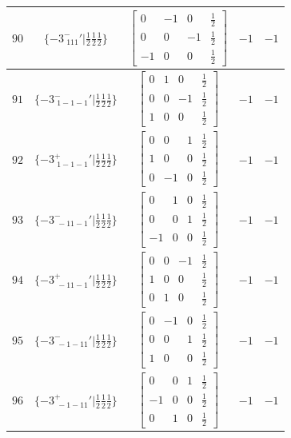 \documentclass[fleqn,8pt]{jsarticle}
\begin{document}
\begin{longtable}{ccccc}
$ 90 $ & $ \{-3^{-}_{\,\,111}{}'|\frac{1}{2} \frac{1}{2} \frac{1}{2}\} $ & $ \begin{bmatrix} 0 & -1 & 0 & \frac{1}{2} \\ 0 & 0 & -1 & \frac{1}{2} \\ -1 & 0 & 0 & \frac{1}{2} \end{bmatrix} $ & $ -1 $ & $ -1 $ \\ \hline
$ 91 $ & $ \{-3^{-}_{\,\,1-1-1}{}'|\frac{1}{2} \frac{1}{2} \frac{1}{2}\} $ & $ \begin{bmatrix} 0 & 1 & 0 & \frac{1}{2} \\ 0 & 0 & -1 & \frac{1}{2} \\ 1 & 0 & 0 & \frac{1}{2} \end{bmatrix} $ & $ -1 $ & $ -1 $ \\ \hline
$ 92 $ & $ \{-3^{+}_{\,\,1-1-1}{}'|\frac{1}{2} \frac{1}{2} \frac{1}{2}\} $ & $ \begin{bmatrix} 0 & 0 & 1 & \frac{1}{2} \\ 1 & 0 & 0 & \frac{1}{2} \\ 0 & -1 & 0 & \frac{1}{2} \end{bmatrix} $ & $ -1 $ & $ -1 $ \\ \hline
$ 93 $ & $ \{-3^{-}_{\,\,-11-1}{}'|\frac{1}{2} \frac{1}{2} \frac{1}{2}\} $ & $ \begin{bmatrix} 0 & 1 & 0 & \frac{1}{2} \\ 0 & 0 & 1 & \frac{1}{2} \\ -1 & 0 & 0 & \frac{1}{2} \end{bmatrix} $ & $ -1 $ & $ -1 $ \\ \hline
$ 94 $ & $ \{-3^{+}_{\,\,-11-1}{}'|\frac{1}{2} \frac{1}{2} \frac{1}{2}\} $ & $ \begin{bmatrix} 0 & 0 & -1 & \frac{1}{2} \\ 1 & 0 & 0 & \frac{1}{2} \\ 0 & 1 & 0 & \frac{1}{2} \end{bmatrix} $ & $ -1 $ & $ -1 $ \\ \hline
$ 95 $ & $ \{-3^{-}_{\,\,-1-11}{}'|\frac{1}{2} \frac{1}{2} \frac{1}{2}\} $ & $ \begin{bmatrix} 0 & -1 & 0 & \frac{1}{2} \\ 0 & 0 & 1 & \frac{1}{2} \\ 1 & 0 & 0 & \frac{1}{2} \end{bmatrix} $ & $ -1 $ & $ -1 $ \\ \hline
$ 96 $ & $ \{-3^{+}_{\,\,-1-11}{}'|\frac{1}{2} \frac{1}{2} \frac{1}{2}\} $ & $ \begin{bmatrix} 0 & 0 & 1 & \frac{1}{2} \\ -1 & 0 & 0 & \frac{1}{2} \\ 0 & 1 & 0 & \frac{1}{2} \end{bmatrix} $ & $ -1 $ & $ -1 $ \\
\end{longtable}
\end{document}
